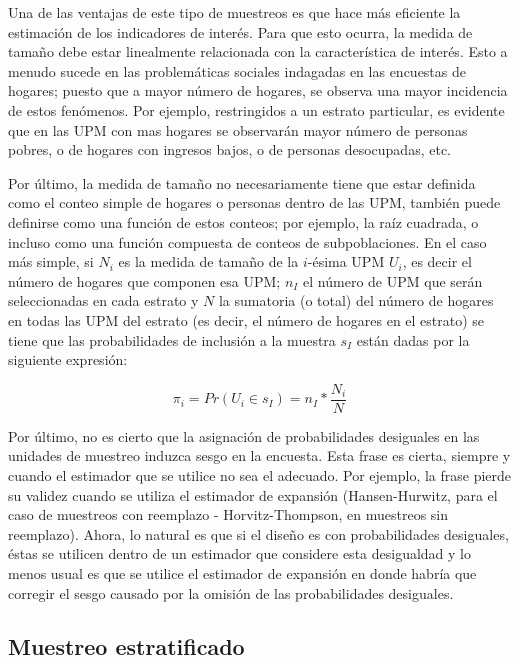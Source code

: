 \documentclass[
  10pt,
  spanish,
]{book}
\begin{document}
Una de las ventajas de este tipo de muestreos es que hace más eficiente la estimación de los indicadores de interés. Para que esto ocurra, la medida de tamaño debe estar linealmente relacionada con la característica de interés. Esto a menudo sucede en las problemáticas sociales indagadas en las encuestas de hogares; puesto que a mayor número de hogares, se observa una mayor incidencia de estos fenómenos. Por ejemplo, restringidos a un estrato particular, es evidente que en las UPM con mas hogares se observarán mayor número de personas pobres, o de hogares con ingresos bajos, o de personas desocupadas, etc.

Por último, la medida de tamaño no necesariamente tiene que estar definida como el conteo simple de hogares o personas dentro de las UPM, también puede definirse como una función de estos conteos; por ejemplo, la raíz cuadrada, o incluso como una función compuesta de conteos de subpoblaciones. En el caso más simple, si \(N_i\) es la medida de tamaño de la \(i\)-ésima UPM \(U_i\), es decir el número de hogares que componen esa UPM; \(n_I\) el número de UPM que serán seleccionadas en cada estrato y \(N\) la sumatoria (o total) del número de hogares en todas las UPM del estrato (es decir, el número de hogares en el estrato) se tiene que las probabilidades de inclusión a la muestra \(s_I\) están dadas por la siguiente expresión:

\[\pi_i = Pr(U_i \in s_I) = n_I * \frac{N_i}{N}\]

Por último, no es cierto que la asignación de probabilidades desiguales en las unidades de muestreo induzca sesgo en la encuesta. Esta frase es cierta, siempre y cuando el estimador que se utilice no sea el adecuado. Por ejemplo, la frase pierde su validez cuando se utiliza el estimador de expansión (Hansen-Hurwitz, para el caso de muestreos con reemplazo - Horvitz-Thompson, en muestreos sin reemplazo). Ahora, lo natural es que si el diseño es con probabilidades desiguales, éstas se utilicen dentro de un estimador que considere esta desigualdad y lo menos usual es que se utilice el estimador de expansión en donde habría que corregir el sesgo causado por la omisión de las probabilidades desiguales.

\hypertarget{muestreo-estratificado}{%
\subsection*{Muestreo estratificado}\label{muestreo-estratificado}}
\end{document}
